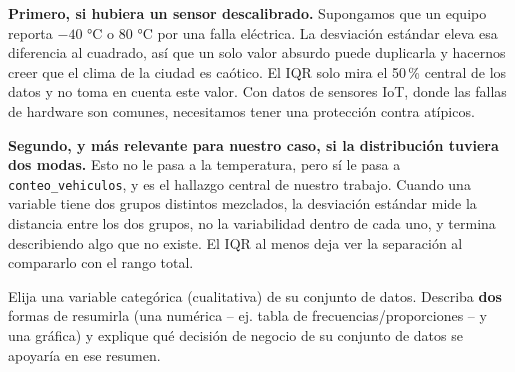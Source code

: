 \documentclass[11pt]{article}
\begin{document}
\begin{respuesta}[Respuesta 1.2]
\textbf{Primero, si hubiera un sensor descalibrado.} Supongamos que un equipo reporta $-40$ °C o $80$ °C por una falla eléctrica. La desviación estándar eleva esa diferencia al cuadrado, así que un solo valor absurdo puede duplicarla y hacernos creer que el clima de la ciudad es caótico. El IQR solo mira el 50\,\% central de los datos y no toma en cuenta este valor. Con datos de sensores IoT, donde las fallas de hardware son comunes, necesitamos tener una protección contra atípicos.

\textbf{Segundo, y más relevante para nuestro caso, si la distribución tuviera dos modas.} Esto no le pasa a la temperatura, pero sí le pasa a \texttt{conteo\_vehiculos}, y es el hallazgo central de nuestro trabajo. Cuando una variable tiene dos grupos distintos mezclados, la desviación estándar mide la distancia entre los dos grupos, no la variabilidad dentro de cada uno, y termina describiendo algo que no existe. El IQR al menos deja ver la separación al compararlo con el rango total.
\end{respuesta}


\begin{pregunta}
Elija una variable categórica (cualitativa) de su conjunto de datos. Describa \textbf{dos} formas de resumirla (una numérica -- ej. tabla de frecuencias/proporciones -- y una gráfica) y explique qué decisión de negocio de su conjunto de datos se apoyaría en ese resumen.
\end{pregunta}
\end{document}
